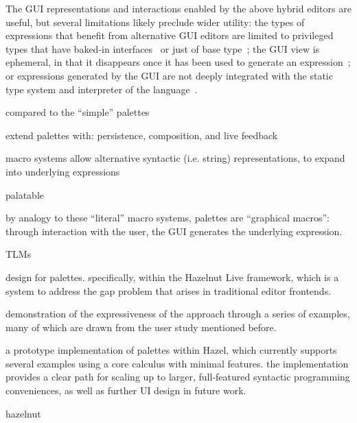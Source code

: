 The GUI representations and interactions enabled by the above hybrid editors are
useful, but several limitations likely preclude wider utility:
%
the types of expressions that benefit from alternative GUI editors are limited
to
%
privileged types that have baked-in interfaces~\citep{XXX}
%
or just of base type~\citep{XXX};
%
the GUI view is ephemeral, in that it disappears once it has been used to
generate an expression~\citep{XXX}; or
%
expressions generated by the GUI are not deeply integrated with the static type
system and interpreter of the language~\citep{XXX,XXX,XXX}.





compared to the ``simple'' palettes

extend palettes with: persistence, composition, and live feedback

macro systems allow alternative syntactic (i.e. string) representations, to
expand into underlying expressions

palatable

by analogy to these ``literal'' macro systems, palettes are ``graphical
macros'': through interaction with the user, the GUI generates the underlying
expression.

TLMs~\cite{TLMs}




design for palettes. specifically, within the Hazelnut Live framework,
which is a system to address the gap problem that arises in traditional editor
frontends.

demonstration of the expressiveness of the approach through a series of
examples, many of which are drawn from the user study mentioned before.

a prototype implementation of palettes within Hazel, which currently
supports several examples using a core calculus with minimal features. the
implementation provides a clear path for scaling up to larger, full-featured
syntactic programming conveniences, as well as further UI design in future work.

hazelnut~\citep{Hazelnut,HazelnutLive}



